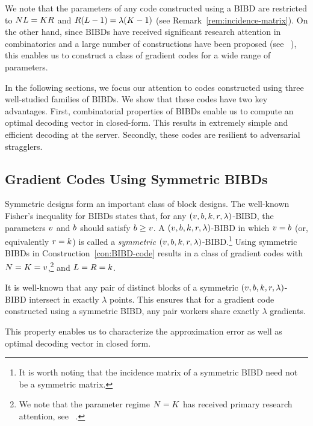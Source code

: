 \documentclass[conference,letterpaper]{IEEEtran}
\begin{document}
{We note that the parameters of any code constructed using a BIBD are restricted to $NL = KR$ and $R(L-1) = \lambda(K-1)$ (see Remark~\ref{rem:incidence-matrix}). On the other hand, since BIBDs have received significant research attention in combinatorics and a large number of constructions have been proposed (see \eg~\cite{Handbook:06}), this enables us to construct a class of gradient codes for a wide range of parameters. 

In the following sections, we focus our attention to codes constructed using three well-studied families of BIBDs. We show that these codes have two key advantages. First,  combinatorial properties of BIBDs enable us to compute an optimal decoding vector in closed-form. This results in extremely simple and efficient decoding at the server. Secondly, these codes are resilient to adversarial stragglers. 
}



\subsection{Gradient Codes Using Symmetric BIBDs}
\label{sec:symmetric-BIBDs}
Symmetric designs form an important class of block designs. The well-known Fisher's inequality for BIBDs states that, for any $(v,b,k,r,\lambda)$-BIBD, the parameters $v$ and $b$ should satisfy $b \geq v$. 
A $(v,b,k,r,\lambda)$-BIBD in which $v = b$ (or, equivalently $r = k$) is called a {\it symmetric} $(v,b,k,r,\lambda)$-BIBD.\footnote{It is worth noting that the incidence matrix of a symmetric BIBD need not be a symmetric matrix.} 
Using symmetric BIBDs in Construction~\ref{con:BIBD-code} results in a class of gradient codes with $N = K = v$,\footnote{We note that the parameter regime $N = K$ has received primary research attention, see \eg~\cite{Tandon:17,Raviv:18,CharlesP:17,CharlesP:18,YeAbbe:18i}.} and $L = R = k$. %

 \begin{remark}
 \label{rem:BIBD-code}
It is well-known that any pair of distinct blocks of a symmetric $(v,b,k,r,\lambda)$-BIBD intersect in exactly $\lambda$ points. This ensures that for a gradient code constructed using a symmetric BIBD, any pair workers share exactly $\lambda$ gradients. 
 \end{remark}
This property enables us to characterize the approximation error as well as optimal decoding vector in closed form.  
\end{document}
